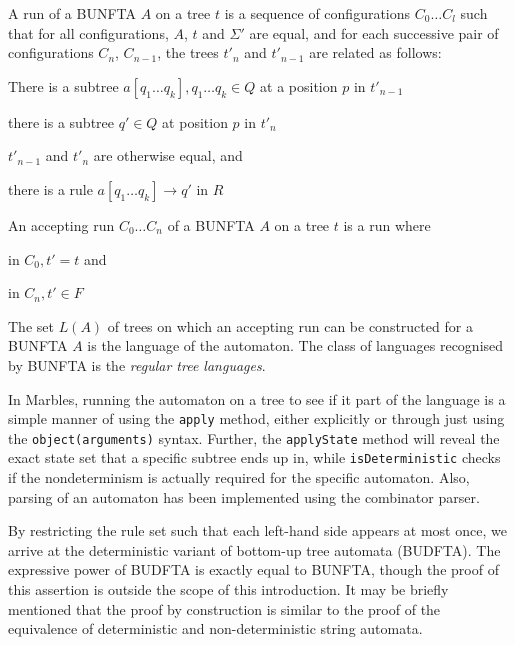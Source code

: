 A run of a BUNFTA $A$ on a tree $t$ is a sequence of configurations $C_0
\ldots C_l$ such that for all configurations, $A$, $t$ and $\Sigma'$ are
equal, and for each successive pair of configurations $C_n$, $C_{n-1}$, the
trees $t'_n$ and $t'_{n-1}$ are related as follows: 
\begin{compactitem}
\item There is a subtree $a[q_1 \ldots q_k], q_1 \ldots q_k \in Q$ at a position $p$ in $t'_{n-1}$
\item there is a subtree $q'\in Q$ at position $p$ in $t'_n$
\item $t'_{n-1}$ and $t'_n$ are otherwise equal, and
\item there is a rule $a[q_1 \ldots q_k] \rightarrow q'$ in $R$
\end{compactitem}
\vspace{0.5cm}

An accepting run ${C_0 \ldots C_n}$ of a BUNFTA $A$ on a tree $t$ is a run where
\begin{compactitem}
\item in $C_0, t' = t$ and
\item in $C_n, t' \in F$ %
\end{compactitem}
\vspace{0.5cm}

The set $L(A)$ of trees on which an accepting run can be constructed for a
BUNFTA $A$ is the language of the automaton. The class of languages
recognised by BUNFTA is the \emph{regular tree languages}.

In Marbles, running the automaton on a tree to see if it part of the
language is a simple manner of using the \texttt{apply} method, either
explicitly or through just using the \texttt{object(arguments)} syntax.
Further, the \texttt{applyState} method will reveal the exact state set
that a specific subtree ends up in, while \texttt{isDeterministic} checks
if the nondeterminism is actually required for the specific automaton.
Also, parsing of an automaton has been implemented using the combinator
parser.

By restricting the rule set such that each left-hand side appears at most
once, we arrive at the deterministic variant of bottom-up tree automata
(BUDFTA). The expressive power of BUDFTA is exactly equal to BUNFTA, though
the proof of this assertion is outside the scope of this introduction. It
may be briefly mentioned that the proof by construction is similar to the
proof of the equivalence of deterministic and non-deterministic string
automata.


